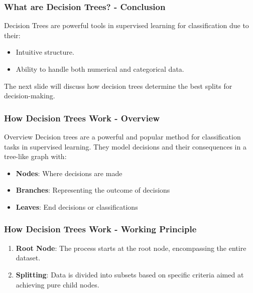 \documentclass[aspectratio=169]{beamer}
\begin{document}
\begin{frame}[fragile]
    \frametitle{What are Decision Trees? - Conclusion}
    Decision Trees are powerful tools in supervised learning for classification due to their:
    \begin{itemize}
        \item Intuitive structure.
        \item Ability to handle both numerical and categorical data.
    \end{itemize}
    The next slide will discuss how decision trees determine the best splits for decision-making.
\end{frame}

\begin{frame}[fragile]
    \frametitle{How Decision Trees Work - Overview}
    \begin{block}{Overview}
        Decision trees are a powerful and popular method for classification tasks in supervised learning. They model decisions and their consequences in a tree-like graph with:
    \end{block}
    \begin{itemize}
        \item \textbf{Nodes}: Where decisions are made
        \item \textbf{Branches}: Representing the outcome of decisions
        \item \textbf{Leaves}: End decisions or classifications
    \end{itemize}
\end{frame}

\begin{frame}[fragile]
    \frametitle{How Decision Trees Work - Working Principle}
    \begin{enumerate}
        \item \textbf{Root Node}: The process starts at the root node, encompassing the entire dataset.
        \item \textbf{Splitting}: Data is divided into subsets based on specific criteria aimed at achieving pure child nodes.
    \end{enumerate}
\end{frame}
\end{document}
